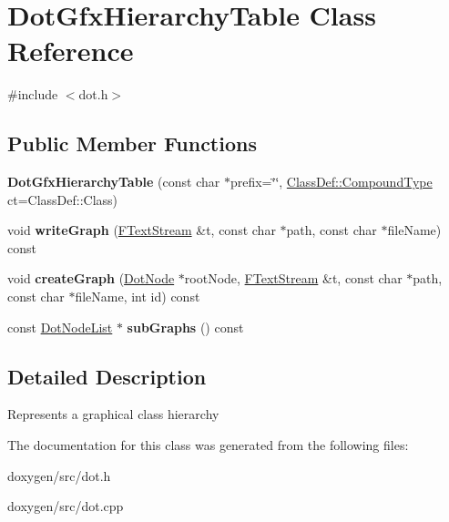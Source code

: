 \hypertarget{class_dot_gfx_hierarchy_table}{}\section{Dot\+Gfx\+Hierarchy\+Table Class Reference}
\label{class_dot_gfx_hierarchy_table}


{\ttfamily \#include $<$dot.\+h$>$}

\subsection*{Public Member Functions}
\begin{DoxyCompactItemize}
\item 
\mbox{\label{class_dot_gfx_hierarchy_table_af977279c195b9783483a8757b55b8225}} 
{\bfseries Dot\+Gfx\+Hierarchy\+Table} (const char $\ast$prefix=\char`\"{}\char`\"{}, \mbox{\hyperlink{class_class_def_ae70cf86d35fe954a94c566fbcfc87939}{Class\+Def\+::\+Compound\+Type}} ct=Class\+Def\+::\+Class)
\item 
\mbox{\label{class_dot_gfx_hierarchy_table_a1cbc2418ba2124e3781bbd307fa52726}} 
void {\bfseries write\+Graph} (\mbox{\hyperlink{class_f_text_stream}{F\+Text\+Stream}} \&t, const char $\ast$path, const char $\ast$file\+Name) const
\item 
\mbox{\label{class_dot_gfx_hierarchy_table_a3944d037ab572eaf71957ada28a61f88}} 
void {\bfseries create\+Graph} (\mbox{\hyperlink{class_dot_node}{Dot\+Node}} $\ast$root\+Node, \mbox{\hyperlink{class_f_text_stream}{F\+Text\+Stream}} \&t, const char $\ast$path, const char $\ast$file\+Name, int id) const
\item 
\mbox{\label{class_dot_gfx_hierarchy_table_a8d304941a2c60fe8ea0d47971abf7279}} 
const \mbox{\hyperlink{class_dot_node_list}{Dot\+Node\+List}} $\ast$ {\bfseries sub\+Graphs} () const
\end{DoxyCompactItemize}


\subsection{Detailed Description}
Represents a graphical class hierarchy 

The documentation for this class was generated from the following files\+:\begin{DoxyCompactItemize}
\item 
doxygen/src/dot.\+h\item 
doxygen/src/dot.\+cpp\end{DoxyCompactItemize}
